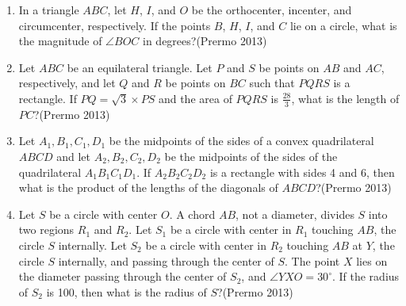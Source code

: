 \begin{enumerate}
\item In a triangle $ ABC $, let $ H $, $ I $, and $ O $ be the orthocenter, incenter, and circumcenter, respectively. If the points $ B $, $ H $, $ I $, and $ C $ lie on a circle, what is the magnitude of $ \angle BOC $ in degrees?\hfill(Prermo 2013)

\item Let $ ABC $ be an equilateral triangle. Let $ P $ and $ S $ be points on $ AB $ and $ AC $, respectively, and let $ Q $ and $ R $ be points on $ BC $ such that $ PQRS $ is a rectangle. If $ PQ = \sqrt{3} \times PS $ and the area of $ PQRS $ is $ \frac{28}{3} $, what is the length of $ PC $?\hfill(Prermo 2013)

\item Let $ A_1, B_1, C_1, D_1 $ be the midpoints of the sides of a convex quadrilateral $ ABCD $ and let $ A_2, B_2, C_2, D_2 $ be the midpoints of the sides of the quadrilateral $ A_1B_1C_1D_1 $. If $ A_2B_2C_2D_2 $ is a rectangle with sides 4 and 6, then what is the product of the lengths of the diagonals of $ ABCD $?\hfill(Prermo 2013)

\item Let $ S $ be a circle with center $ O $. A chord $ AB $, not a diameter, divides $ S $ into two regions $ R_1 $ and $ R_2 $. Let $ S_1 $ be a circle with center in $ R_1 $ touching $ AB $, the circle $ S $ internally. Let $ S_2 $ be a circle with center in $ R_2 $ touching $ AB $ at $ Y $, the circle $ S $ internally, and passing through the center of $ S $. The point $ X $ lies on the diameter passing through the center of $ S_2 $, and $ \angle YXO = 30^\circ $. If the radius of $ S_2 $ is 100, then what is the radius of $ S $?\hfill(Prermo 2013)


\end{enumerate}

